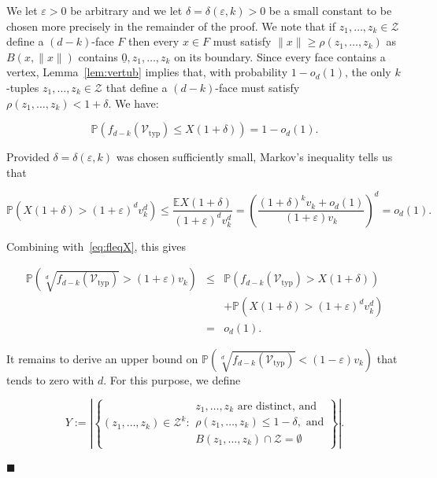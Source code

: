 \documentclass[11pt]{article}%
\newenvironment{proofof}[1]{\vspace{1ex}\noindent{\bf Proof of #1.}}{\hspace*{\fill}$\blacksquare$\vspace{1ex}}
\newcommand{\Vcal}[0]{\ensuremath{{\mathcal V}}}
\newcommand{\Zcal}[0]{\ensuremath{{\mathcal Z}}}
\newcommand{\norm}[1]{\ensuremath{\|#1\|}}
\newcommand{\Pee}[0]{\ensuremath{{\mathbb P}}}
\newcommand{\Ee}[0]{\ensuremath{{\mathbb E}}}
\newcommand{\eps}{\varepsilon}
\newcommand{\orig}{\underline{0}}
\newcommand{\Vtyp}[0]{\Vcal_{\text{typ}}}
\begin{document}
\begin{proofof}{Theorem~\ref{thm:fass}}
We let $\eps>0$ be arbitrary and we let $\delta=\delta(\eps,k)>0$ be a small constant to be chosen more precisely 
in the remainder of the proof.
We note that if $z_1,\dots,z_k \in \Zcal$ define a $(d-k)$-face $F$ then
every $x \in F$ must satisfy $\norm{x} \geq \rho(z_1,\dots,z_k)$ as
$B(x,\norm{x})$ contains $\orig,z_1,\dots,z_k$ on its boundary.
Since every face contains a vertex, Lemma~\ref{lem:vertub} implies that, with probability $1-o_d(1)$, 
the only $k$-tuples $z_1,\dots,z_k \in \Zcal$ that define a $(d-k)$-face
must satisfy $\rho(z_1,\dots,z_k) < 1+\delta$. 
We have:

\begin{equation}\label{eq:fleqX}
\Pee\left( f_{d-k}(\Vtyp) \leq X(1+\delta) \right) = 1-o_d(1).
\end{equation}


\noindent
Provided $\delta=\delta(\eps,k)$ was chosen sufficiently small, Markov's inequality tells us that 

$$ \Pee\left( X(1+\delta) > (1+\eps)^d v_k^d \right) \leq 
\frac{\Ee X(1+\delta)}{(1+\eps)^d v_k^d} 
= \left( \frac{(1+\delta)^k v_k + o_d(1)}{(1+\eps)v_k}\right)^d
= o_d(1). $$

\noindent
Combining with~\eqref{eq:fleqX}, this gives 

\begin{equation}\label{eq:fassub} \begin{array}{rcl} 
\displaystyle 
\Pee\left( \sqrt[d]{f_{d-k}(\Vtyp)} > (1+\eps) v_k \right)
& \leq & \displaystyle 
\Pee\left( f_{d-k}(\Vtyp) > X(1+\delta) \right) \\
& & \displaystyle + \Pee\left( X(1+\delta) > (1+\eps)^d v_k^d \right) \\
& = & o_d(1). 
\end{array} \end{equation}

It remains to derive an upper bound on $\Pee\left( \sqrt[d]{f_{d-k}(\Vtyp)} < (1-\eps) v_k \right)$ that tends to zero with $d$.
For this purpose, we define 

\begin{equation}\label{eq:Ydef} 
Y := \left|\left\{ (z_1,\dots,z_k) \in \Zcal^k : \begin{array}{l} z_1,\dots,z_k \text{ are distinct, and} \\
\rho(z_1,\dots,z_k) \leq 1-\delta, \text{ and} \\
B(z_1,\dots,z_k) \cap \Zcal = \emptyset \end{array} \right\}\right|.
\end{equation}


\end{proofof}
\end{document}

